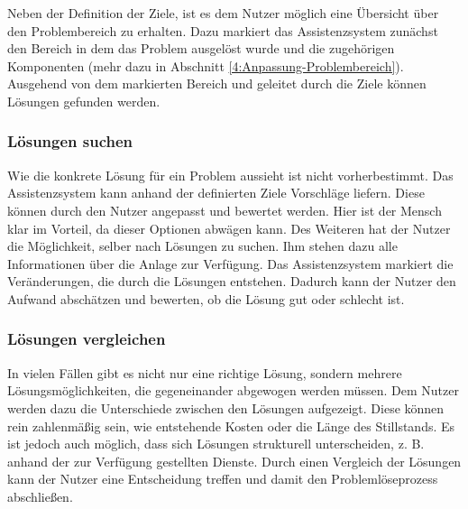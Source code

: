 Neben der Definition der Ziele, ist es dem Nutzer möglich eine Übersicht über den Problembereich zu erhalten. Dazu markiert das Assistenzsystem zunächst den Bereich in dem das Problem ausgelöst wurde und die zugehörigen Komponenten (mehr dazu in Abschnitt \ref{4:Anpassung-Problembereich}).
Ausgehend von dem markierten Bereich und geleitet durch die Ziele können Lösungen gefunden werden.

\subsubsection*{Lösungen suchen}
Wie die konkrete Lösung für ein Problem aussieht ist nicht vorherbestimmt. Das Assistenzsystem kann anhand der definierten Ziele Vorschläge liefern. Diese können durch den Nutzer angepasst und bewertet werden. Hier ist der Mensch klar im Vorteil, da dieser Optionen abwägen kann. Des Weiteren hat der Nutzer die Möglichkeit, selber nach Lösungen zu suchen. Ihm stehen dazu alle Informationen über die Anlage zur Verfügung. Das Assistenzsystem markiert die Veränderungen, die durch die Lösungen entstehen. Dadurch kann der Nutzer den Aufwand abschätzen und bewerten, ob die Lösung gut oder schlecht ist.

\subsubsection*{Lösungen vergleichen}
In vielen Fällen gibt es nicht nur eine richtige Lösung, sondern mehrere Lösungsmöglichkeiten, die gegeneinander abgewogen werden müssen. Dem Nutzer werden dazu die Unterschiede zwischen den Lösungen aufgezeigt. Diese können rein zahlenmäßig sein, wie entstehende Kosten oder die Länge des Stillstands. Es ist jedoch auch möglich, dass sich Lösungen strukturell unterscheiden, z. B. anhand der zur Verfügung gestellten Dienste. Durch einen Vergleich der Lösungen kann der Nutzer eine Entscheidung treffen und damit den Problemlöseprozess abschließen.


